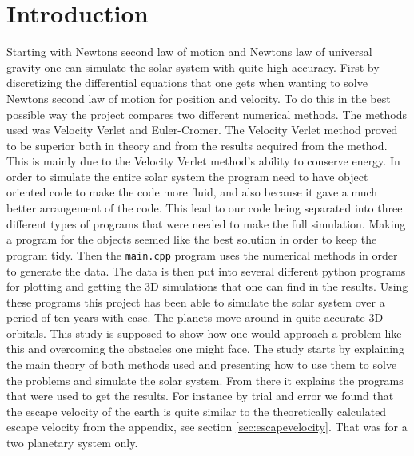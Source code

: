 \documentclass{article}
\begin{document}
\newpage


\vspace{1cm}

\tableofcontents

\vspace{1cm}

\vspace{1cm}

\section{Introduction} \label{sec:Introduction}


    Starting with Newtons second law of motion and Newtons law of universal gravity one can simulate the solar system with quite high accuracy. First by discretizing the differential equations that one gets when wanting to solve Newtons second law of motion for position and velocity. To do this in the best possible way the project compares two different numerical methods. The methods used was Velocity Verlet and Euler-Cromer. The Velocity Verlet method proved to be superior both in theory and from the results acquired from the method. This is mainly due to the Velocity Verlet method's ability to conserve energy. In order to simulate the entire solar system the program need to have object oriented code to make the code more fluid, and also because it gave a much better arrangement of the code. This lead to our code being separated into three different types of programs that were needed to make the full simulation. Making a program for the objects seemed like the best solution in order to keep the program tidy. Then the \texttt{main.cpp} program uses the numerical methods in order to generate the data. The data is then put into several different python programs for plotting and getting the 3D simulations that one can find in the results. Using these programs this project has been able to simulate the solar system over a period of ten years with ease. The planets move around in quite accurate 3D orbitals.
    This study is supposed to show how one would approach a problem like this and overcoming the obstacles one might face. The study starts by explaining the main theory of both methods used and presenting how to use them to solve the problems and simulate the solar system. From there it explains the programs that were used to get the results. For instance by trial and error we found that the escape velocity of the earth is quite similar to the theoretically calculated escape velocity from the appendix, see section \ref{sec:escapevelocity}. That was for a two planetary system only. \\
\end{document}

